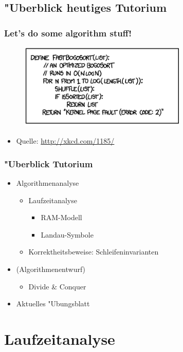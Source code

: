 \subsection{"Uberblick heutiges Tutorium}
\begin{frame}[fragile]
  \frametitle{Let's do some algorithm stuff!}
  \begin{figure}[!t]
    \includegraphics[width=300px]{fastbogosort.png}
    \label{fig:fastbogosort}
  \end{figure}
  \begin{itemize}
  \item Quelle: \url{http://xkcd.com/1185/}
  \end{itemize}
\end{frame}

\begin{frame}
  \frametitle{"Uberblick Tutorium}
  \begin{itemize}
  \item Algorithmenanalyse
    \begin{itemize}
    \item Laufzeitanalyse
      \begin{itemize}
      \item RAM-Modell
      \item Landau-Symbole
      \end{itemize}
    \item Korrektheitsbeweise: Schleifeninvarianten
    \end{itemize}
  \item (Algorithmenentwurf)
    \begin{itemize}
    \item Divide \& Conquer
    \end{itemize}
  \item Aktuelles "Ubungsblatt
  \end{itemize}
\end{frame}

\section{Laufzeitanalyse}
